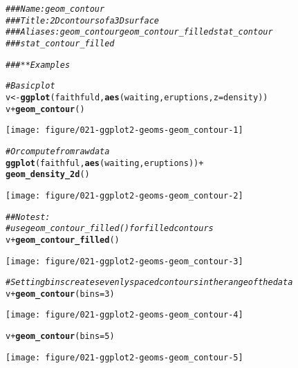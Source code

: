 \documentclass[a4paper,titlepage]{tufte-handout}\usepackage[]{graphicx}\usepackage[]{xcolor}
\makeatletter
\def\maxwidth{ %
  \ifdim\Gin@nat@width>\linewidth
    \linewidth
  \else
    \Gin@nat@width
  \fi
}
\newcommand{\hlnum}[1]{\textcolor[rgb]{0.686,0.059,0.569}{#1}}%
\newcommand{\hlcom}[1]{\textcolor[rgb]{0.678,0.584,0.686}{\textit{#1}}}%
\newcommand{\hlopt}[1]{\textcolor[rgb]{0,0,0}{#1}}%
\newcommand{\hldef}[1]{\textcolor[rgb]{0.345,0.345,0.345}{#1}}%
\newcommand{\hlkwb}[1]{\textcolor[rgb]{0.69,0.353,0.396}{#1}}%
\newcommand{\hlkwc}[1]{\textcolor[rgb]{0.333,0.667,0.333}{#1}}%
\newcommand{\hlkwd}[1]{\textcolor[rgb]{0.737,0.353,0.396}{\textbf{#1}}}%
\newenvironment{kframe}{%
 \def\at@end@of@kframe{}%
 \ifinner\ifhmode%
  \def\at@end@of@kframe{\end{minipage}}%
  \begin{minipage}{\columnwidth}%
 \fi\fi%
 \def\FrameCommand##1{\hskip\@totalleftmargin \hskip-\fboxsep
 \colorbox{shadecolor}{##1}\hskip-\fboxsep
     \hskip-\linewidth \hskip-\@totalleftmargin \hskip\columnwidth}%
 \MakeFramed {\advance\hsize-\width
   \@totalleftmargin\z@ \linewidth\hsize
   \@setminipage}}%
 {\par\unskip\endMakeFramed%
 \at@end@of@kframe}
\newenvironment{knitrout}{}{} %
\makeatother
\begin{document}
\begin{knitrout}
\color{fgcolor}\begin{kframe}
\begin{alltt}
\hlcom{### Name: geom_contour}
\hlcom{### Title: 2D contours of a 3D surface}
\hlcom{### Aliases: geom_contour geom_contour_filled stat_contour}
\hlcom{###   stat_contour_filled}

\hlcom{### ** Examples}

\hlcom{# Basic plot}
\hldef{v} \hlkwb{<-} \hlkwd{ggplot}\hldef{(faithfuld,} \hlkwd{aes}\hldef{(waiting, eruptions,} \hlkwc{z} \hldef{= density))}
\hldef{v} \hlopt{+} \hlkwd{geom_contour}\hldef{()}
\end{alltt}
\end{kframe}
\texttt{[image: figure/021-ggplot2-geoms-geom\_contour-1]} 
\begin{kframe}\begin{alltt}
\hlcom{# Or compute from raw data}
\hlkwd{ggplot}\hldef{(faithful,} \hlkwd{aes}\hldef{(waiting, eruptions))} \hlopt{+}
  \hlkwd{geom_density_2d}\hldef{()}
\end{alltt}
\end{kframe}
\texttt{[image: figure/021-ggplot2-geoms-geom\_contour-2]} 
\begin{kframe}\begin{alltt}
\hlcom{## No test: }
\hlcom{# use geom_contour_filled() for filled contours}
\hldef{v} \hlopt{+} \hlkwd{geom_contour_filled}\hldef{()}
\end{alltt}
\end{kframe}
\texttt{[image: figure/021-ggplot2-geoms-geom\_contour-3]} 
\begin{kframe}\begin{alltt}
\hlcom{# Setting bins creates evenly spaced contours in the range of the data}
\hldef{v} \hlopt{+} \hlkwd{geom_contour}\hldef{(}\hlkwc{bins} \hldef{=} \hlnum{3}\hldef{)}
\end{alltt}
\end{kframe}
\texttt{[image: figure/021-ggplot2-geoms-geom\_contour-4]} 
\begin{kframe}\begin{alltt}
\hldef{v} \hlopt{+} \hlkwd{geom_contour}\hldef{(}\hlkwc{bins} \hldef{=} \hlnum{5}\hldef{)}
\end{alltt}
\end{kframe}
\texttt{[image: figure/021-ggplot2-geoms-geom\_contour-5]} 

\end{knitrout}
\end{document}
